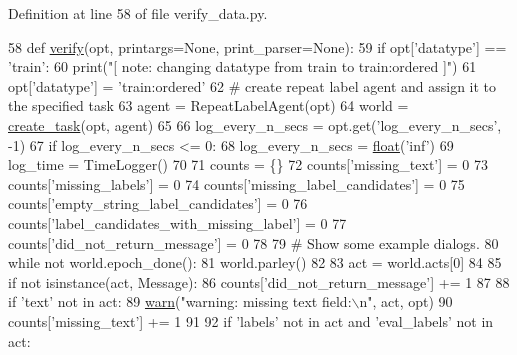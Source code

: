 Definition at line 58 of file verify\+\_\+data.\+py.


\begin{DoxyCode}
58 \textcolor{keyword}{def }\hyperlink{namespaceparlai_1_1scripts_1_1verify__data_acf6da63d62b2bf71c8fb7860e944a5bf}{verify}(opt, printargs=None, print\_parser=None):
59     \textcolor{keywordflow}{if} opt[\textcolor{stringliteral}{'datatype'}] == \textcolor{stringliteral}{'train'}:
60         print(\textcolor{stringliteral}{"[ note: changing datatype from train to train:ordered ]"})
61         opt[\textcolor{stringliteral}{'datatype'}] = \textcolor{stringliteral}{'train:ordered'}
62     \textcolor{comment}{# create repeat label agent and assign it to the specified task}
63     agent = RepeatLabelAgent(opt)
64     world = \hyperlink{namespaceparlai_1_1core_1_1worlds_a11923c10b545c7ecc1b08fe2242d9c2c}{create\_task}(opt, agent)
65 
66     log\_every\_n\_secs = opt.get(\textcolor{stringliteral}{'log\_every\_n\_secs'}, -1)
67     \textcolor{keywordflow}{if} log\_every\_n\_secs <= 0:
68         log\_every\_n\_secs = \hyperlink{namespaceprojects_1_1controllable__dialogue_1_1make__control__dataset_aa2b7207688c641dbc094ab44eca27113}{float}(\textcolor{stringliteral}{'inf'})
69     log\_time = TimeLogger()
70 
71     counts = \{\}
72     counts[\textcolor{stringliteral}{'missing\_text'}] = 0
73     counts[\textcolor{stringliteral}{'missing\_labels'}] = 0
74     counts[\textcolor{stringliteral}{'missing\_label\_candidates'}] = 0
75     counts[\textcolor{stringliteral}{'empty\_string\_label\_candidates'}] = 0
76     counts[\textcolor{stringliteral}{'label\_candidates\_with\_missing\_label'}] = 0
77     counts[\textcolor{stringliteral}{'did\_not\_return\_message'}] = 0
78 
79     \textcolor{comment}{# Show some example dialogs.}
80     \textcolor{keywordflow}{while} \textcolor{keywordflow}{not} world.epoch\_done():
81         world.parley()
82 
83         act = world.acts[0]
84 
85         \textcolor{keywordflow}{if} \textcolor{keywordflow}{not} isinstance(act, Message):
86             counts[\textcolor{stringliteral}{'did\_not\_return\_message'}] += 1
87 
88         \textcolor{keywordflow}{if} \textcolor{stringliteral}{'text'} \textcolor{keywordflow}{not} \textcolor{keywordflow}{in} act:
89             \hyperlink{namespaceparlai_1_1scripts_1_1verify__data_ab1f264e6d69b1abe3399ba05512f8c66}{warn}(\textcolor{stringliteral}{"warning: missing text field:\(\backslash\)n"}, act, opt)
90             counts[\textcolor{stringliteral}{'missing\_text'}] += 1
91 
92         \textcolor{keywordflow}{if} \textcolor{stringliteral}{'labels'} \textcolor{keywordflow}{not} \textcolor{keywordflow}{in} act \textcolor{keywordflow}{and} \textcolor{stringliteral}{'eval\_labels'} \textcolor{keywordflow}{not} \textcolor{keywordflow}{in} act:

\end{DoxyCode}
